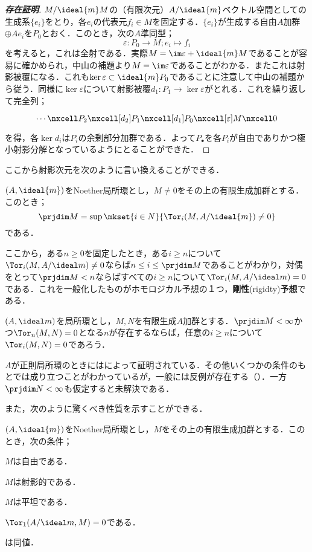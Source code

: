 \begin{proof}[\textbf{存在証明}]
	$M/\ideal{m}M$の（有限次元）$A/\ideal{m}$ベクトル空間としての生成系$\{e_i\}$をとり，各$e_i$の代表元$f_i\in M$を固定する．$\{e_i\}$が生成する自由$A$加群$\oplus Ae_i$を$P_0$とおく．このとき，次の$A$準同型；
	\[\varepsilon:P_0\to M;e_i\mapsto f_i\]
	を考えると，これは全射である．実際$M=\im\varepsilon+\ideal{m}M$であることが容易に確かめられ，中山の補題より$M=\im\varepsilon$であることがわかる．またこれは射影被覆になる．これも$\ker\varepsilon\subset\ideal{m}P_0$であることに注意して中山の補題から従う．同様に$\ker\varepsilon$について射影被覆$d_1:P_1\to\ker\varepsilon$がとれる．これを繰り返して完全列；
	\[\begin{tikzcd}
	\cdots\nxcell P_2\nxcell[d_2]P_1\nxcell[d_1]P_0\nxcell[\varepsilon]M\nxcell0
	\end{tikzcd}\]
	を得，各$\ker d_i$は$P_i$の余剰部分加群である．よって$P_\bullet$を各$P_i$が自由でありかつ極小射影分解となっているようにとることができた．
\end{proof}

ここから射影次元を次のように言い換えることができる．

\begin{thm}\label{thm:射影次元の言い換え}
	$(A,\ideal{m})$をNoether局所環とし，$M\neq0$をその上の有限生成加群とする．このとき；
	\[\prjdim M=\sup\mkset{i\in N}{\Tor_i(M,A/\ideal{m})\neq0}\]
	である．
\end{thm}

ここから，ある$n\geq0$を固定したとき，ある$i\geq n$について$\Tor_i(M,A/\ideal m)\neq0$ならば$n\leq i\leq\prjdim M$であることがわかり，対偶をとって$\prjdim M<n$ならばすべての$i\geq n$について$\Tor_i(M,A/\ideal m)=0$である．これを一般化したものがホモロジカル予想の１つ，\textbf{剛性}(rigidty)\textbf{予想}である．

\begin{conj}[剛性予想]
	$(A,\ideal m)$を局所環とし，$M,N$を有限生成$A$加群とする．$\prjdim M<\infty$かつ$\Tor_n(M,N)=0$となる$n$が存在するならば，任意の$i\geq n$について$\Tor_i(M,N)=0$であろう．
\end{conj}

$A$が正則局所環のときには\cite{lichtenbaum1966}によって証明されている．その他いくつかの条件のもとでは成り立つことがわかっているが，一般には反例が存在する（\cite{heitmann1993counterexample}）．一方$\prjdim N<\infty$も仮定すると未解決である．

また，次のように驚くべき性質を示すことができる．


\begin{prop}
	$(A,\ideal{m})$をNoether局所環とし，$M$をその上の有限生成加群とする．このとき，次の条件；
	\begin{sakura}
		\item $M$は自由である．
		\item $M$は射影的である．
		\item $M$は平坦である．
		\item $\Tor_1(A/\ideal m,M)=0$である．
	\end{sakura}
	は同値．
\end{prop}

